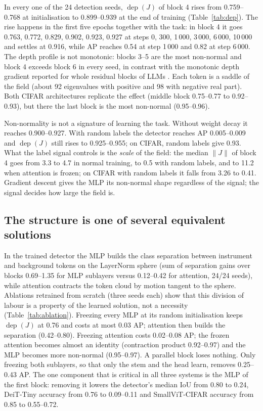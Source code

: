\documentclass[10pt]{article}
\newcommand{\dep}{\operatorname{dep}}
\begin{document}
In every one of the 24 detection seeds, $\dep(J)$ of block 4 rises from 0.759--0.768 at initialisation to 0.899--0.939 at the end of
training (Table~\ref{tab:dep}). The rise happens in the first five epochs together with the task: in block 4 it goes 0.763, 0.772,
0.829, 0.902, 0.923, 0.927 at steps 0, 300, 1\,000, 3\,000, 6\,000, 10\,000 and settles at 0.916, while AP reaches 0.54 at step 1\,000
and 0.82 at step 6\,000. The depth profile is not monotonic: blocks 3--5 are the most non-normal and block 4 exceeds block 6 in every
seed, in contrast with the monotonic depth gradient reported for whole residual blocks of LLMs \citep{fernando2026dynamics}. Each token
is a saddle of the field (about 92 eigenvalues with positive and 98 with negative real part). Both CIFAR architectures replicate the
effect (middle block 0.75--0.77 to 0.92--0.93), but there the last block is the most non-normal (0.95--0.96).

Non-normality is not a signature of learning the task. Without weight decay it reaches 0.900--0.927. With random labels the detector
reaches AP 0.005--0.009 and $\dep(J)$ still rises to 0.925--0.955; on CIFAR, random labels give 0.93. What the label signal controls is the
\emph{scale} of the field: the median $\|J\|$ of block 4 goes from 3.3 to 4.7 in normal training, to 0.5 with random labels, and to 11.2
when attention is frozen; on CIFAR with random labels it falls from 3.26 to 0.41. Gradient descent gives the MLP its non-normal shape
regardless of the signal; the signal decides how large the field is.

\subsection{The structure is one of several equivalent solutions}
\label{sec:compensation}

In the trained detector the MLP builds the class separation between instrument and background tokens on the LayerNorm sphere (sum of
separation gains over blocks 0.69--1.35 for MLP sublayers versus 0.12--0.42 for attention, 24/24 seeds), while attention contracts the
token cloud by motion tangent to the sphere. Ablations retrained from scratch (three seeds each) show that this division of labour is a
property of the learned solution, not a necessity (Table~\ref{tab:ablation}). Freezing every MLP at its random initialisation keeps
$\dep(J)$ at 0.76 and costs at most 0.03 AP; attention then builds the separation (0.42--0.80). Freezing attention costs 0.02--0.08 AP;
the frozen attention becomes almost an identity (contraction product 0.92--0.97) and the MLP becomes more non-normal (0.95--0.97).
A parallel block loses nothing. Only freezing both sublayers, so that only the stem and the head learn, removes 0.25--0.43 AP. The one
component that is critical in all three systems is the MLP of the first block: removing it lowers the detector's median IoU from 0.80 to
0.24, DeiT-Tiny accuracy from 0.76 to 0.09--0.11 and SmallViT-CIFAR accuracy from 0.85 to 0.55--0.72.
\end{document}
